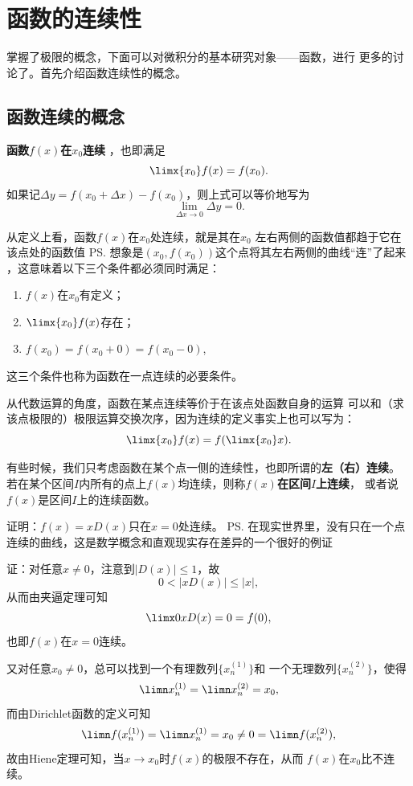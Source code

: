 \newpage
\section{函数的连续性}

掌握了极限的概念，下面可以对微积分的基本研究对象——函数，进行
更多的讨论了。首先介绍函数连续性的概念。

\subsection{函数连续的概念}

\begin{thx}
{\bf 函数$f(x)$在$x_0$连续}
，也即满足
	$$\limx{x_0}f(x)=f(x_0).$$
	如果记$\Delta y=f(x_0+\Delta x)-f(x_0)$，则上式可以等价地写为
	$$\lim\limits_{\Delta x\to 0}\Delta y=0.$$
\end{thx}

从定义上看，函数$f(x)$在$x_0$处连续，就是其在$x_0$
左右两侧的函数值都趋于它在该点处的函数值
\ps{想象是$(x_0,f(x_0))$这个点将其左右两侧的曲线“连”了起来}
，这意味着以下三个条件都必须同时满足：
\begin{enumerate}[(1)]
	\setlength{\itemindent}{1cm}
	\item $f(x)$在$x_0$有定义； 
	\item $\limx{x_0}f(x)$存在； 
	\item $f(x_0)=f(x_0+0)=f(x_0-0)$,
\end{enumerate}
这三个条件也称为函数在一点连续的必要条件。

\bs
从代数运算的角度，函数在某点连续等价于在该点处函数自身的运算
可以和（求该点极限的）极限运算交换次序，因为连续的定义事实上也可以写为：
$$\limx{x_0}f(x)=f(\limx{x_0}x).$$

\bs
有些时候，我们只考虑函数在某个点一侧的连续性，也即所谓的{\bf 左（右）连续}。
若在某个区间$I$内所有的点上$f(x)$均连续，则称{\bf $f(x)$在区间$I$上连续}，
或者说{$f(x)$是区间$I$上的连续函数}。

\bs
\egz 证明：$f(x)=xD(x)$只在$x=0$处连续。
\ps{在现实世界里，没有只在一个点连续的曲线，这是数学概念和直观现实存在差异的一个很好的例证}

证：对任意$x\ne 0$，注意到$|D(x)|\leq 1$，故
$$0<|xD(x)|\leq |x|,$$
从而由夹逼定理可知
$$\limx0xD(x)=0=f(0),$$
也即$f(x)$在$x=0$连续。

又对任意$x_0\ne0$，总可以找到一个有理数列$\{x_n^{(1)}\}$和
一个无理数列$\{x_n^{(2)}\}$，使得
$$\limn x_n^{(1)}=\limn x_n^{(2)}=x_0,$$
而由Dirichlet函数的定义可知
$$\limn f(x_n^{(1)})=\limn x_n^{(1)}=x_0\ne 0=\limn f(x_n^{(2)}),$$
故由Hiene定理可知，当$x\to x_0$时$f(x)$的极限不存在，从而
$f(x)$在$x_0$比不连续。

